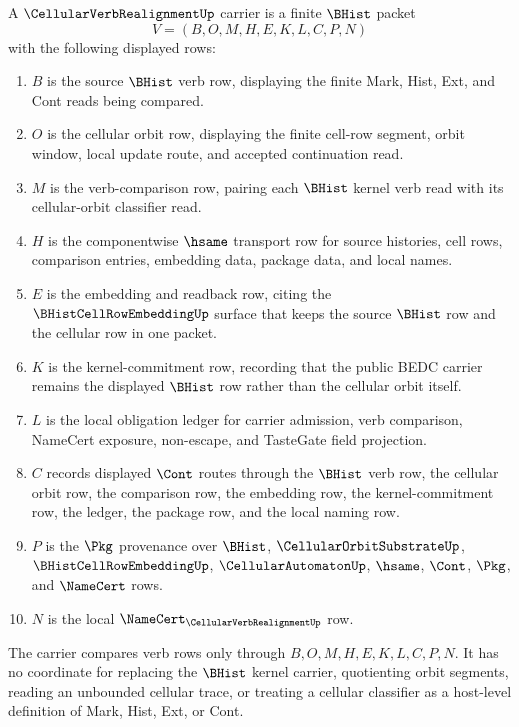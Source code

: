 \begin{definition}
\label{def:cellular-verb-realignment-carrier}
A $\CellularVerbRealignmentUp$ carrier is a finite $\BHist$ packet
$$
V=(B,O,M,H,E,K,L,C,P,N)
$$
with the following displayed rows:
\begin{enumerate}
\item $B$ is the source $\BHist$ verb row, displaying the finite Mark, Hist, Ext, and Cont reads being compared.
\item $O$ is the cellular orbit row, displaying the finite cell-row segment, orbit window, local update route, and accepted continuation read.
\item $M$ is the verb-comparison row, pairing each $\BHist$ kernel verb read with its cellular-orbit classifier read.
\item $H$ is the componentwise $\hsame$ transport row for source histories, cell rows, comparison entries, embedding data, package data, and local names.
\item $E$ is the embedding and readback row, citing the $\BHistCellRowEmbeddingUp$ surface that keeps the source $\BHist$ row and the cellular row in one packet.
\item $K$ is the kernel-commitment row, recording that the public BEDC carrier remains the displayed $\BHist$ row rather than the cellular orbit itself.
\item $L$ is the local obligation ledger for carrier admission, verb comparison, NameCert exposure, non-escape, and TasteGate field projection.
\item $C$ records displayed $\Cont$ routes through the $\BHist$ verb row, the cellular orbit row, the comparison row, the embedding row, the kernel-commitment row, the ledger, the package row, and the local naming row.
\item $P$ is the $\Pkg$ provenance over $\BHist$, $\CellularOrbitSubstrateUp$, $\BHistCellRowEmbeddingUp$, $\CellularAutomatonUp$, $\hsame$, $\Cont$, $\Pkg$, and $\NameCert$ rows.
\item $N$ is the local $\NameCert_{\CellularVerbRealignmentUp}$ row.
\end{enumerate}
The carrier compares verb rows only through $B,O,M,H,E,K,L,C,P,N$. It has no coordinate for replacing the $\BHist$ kernel carrier, quotienting orbit segments, reading an unbounded cellular trace, or treating a cellular classifier as a host-level definition of Mark, Hist, Ext, or Cont.
\end{definition}

